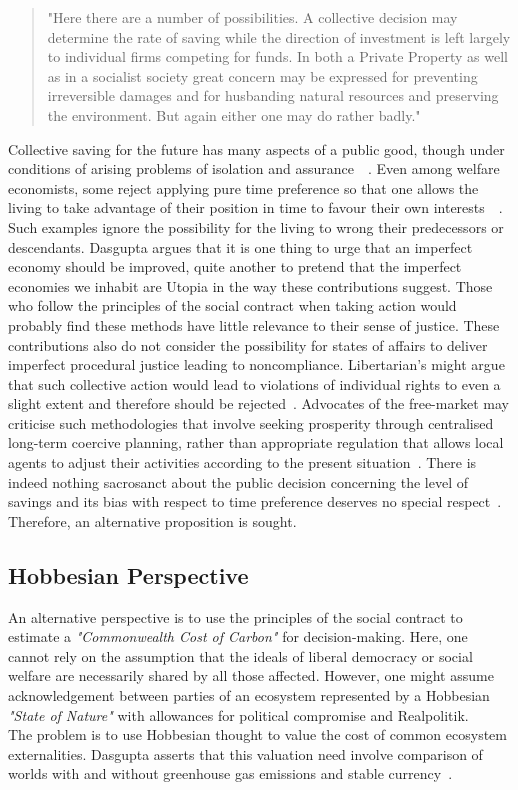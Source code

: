 \documentclass[11pt, oneside]{article}   	%
\begin{document}
\begin{quote}
"Here there are a number of possibilities. A collective decision may determine the rate of saving while the direction of investment is left largely to individual firms competing for funds. In both a Private Property as well as in a socialist society great concern may be expressed for preventing irreversible damages and for husbanding natural resources and preserving the environment. But again either one may do rather badly."~\cite{jr1}
\end{quote}

Collective saving for the future has many aspects of a public good, though under conditions of arising problems of isolation and assurance~\cite{as1}~\cite{ms1}.
Even among welfare economists, some reject applying pure time preference so that one allows the living to take advantage of their position in time to favour their own interests~\cite{hs1}~\cite{fr1}.
Such examples ignore the possibility for the living to wrong their predecessors or descendants.
Dasgupta argues that it is one thing to urge that an imperfect economy should be improved, quite another to pretend that the imperfect economies we inhabit are Utopia in the way these contributions suggest.
Those who follow the principles of the social contract when taking action would probably find these methods have little relevance to their sense of justice.
These contributions also do not consider the possibility for states of affairs to deliver imperfect procedural justice leading to noncompliance.
Libertarian's might argue that such collective action would lead to violations of individual rights to even a slight extent and therefore should be rejected~\cite{rn1}.
Advocates of the free-market may criticise such methodologies that involve seeking prosperity through centralised long-term coercive planning, rather than appropriate regulation that allows local agents to adjust their activities according to the present situation~\cite{fh1}.
There is indeed nothing sacrosanct about the public decision concerning the level of savings and its bias with respect to time preference deserves no special respect~\cite{jr1}.
Therefore, an alternative proposition is sought.\\

\subsection{Hobbesian Perspective}

An alternative perspective is to use the principles of the social contract to estimate a \emph{"Commonwealth Cost of Carbon"} for decision-making.
Here, one cannot rely on the assumption that the ideals of liberal democracy or social welfare are necessarily shared by all those affected.
However, one might assume acknowledgement between parties of an ecosystem represented by a Hobbesian \emph{"State of Nature"} with allowances for political compromise and Realpolitik.\\
The problem is to use Hobbesian thought to value the cost of common ecosystem externalities.
Dasgupta asserts that this valuation need involve comparison of worlds with and without greenhouse gas emissions and stable currency~\cite{pd2}.\\
\end{document}
